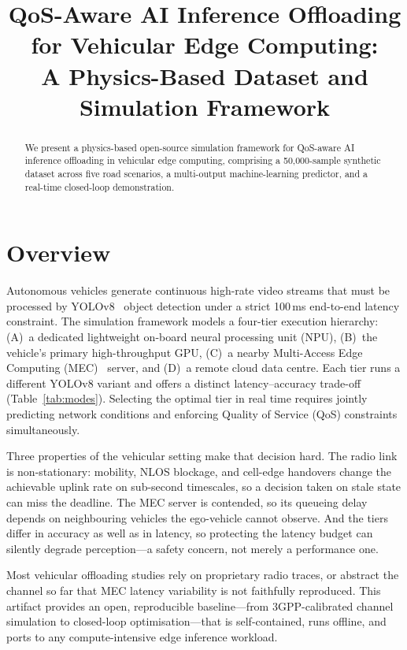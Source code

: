 \documentclass[10pt,conference]{IEEEtran}
\title{QoS-Aware AI Inference Offloading for Vehicular Edge Computing:\\
       A Physics-Based Dataset and Simulation Framework}
\author{%
  \IEEEauthorblockN{%
    Konstantinos Gyftodimos,\quad
    Eirini Liotou,\quad
    Kyriakos Chiotis,\quad
    George Dimitrakopoulos%
  }%
  \IEEEauthorblockA{%
    Dept.\ of Informatics and Telematics,
    Harokopio University of Athens (HUA), Athens, Greece\\
    \{kgyftodimos,\;eliotou,\;kchiotis,\;gdimitra\}@\textit{hua.gr}\quad
    \textit{Presenter: K.\,Gyftodimos\,---\,onsite}%
  }%
}
\begin{document}
\maketitle

\begin{abstract}
We present a physics-based open-source simulation framework for QoS-aware AI
inference offloading in vehicular edge computing, comprising a 50,000-sample
synthetic dataset across five road scenarios, a multi-output machine-learning
predictor, and a real-time closed-loop demonstration.
\end{abstract}

\section{Overview}

Autonomous vehicles generate continuous high-rate video streams that must be
processed by YOLOv8~\cite{yolov8} object detection under a strict 100\,ms
end-to-end latency constraint.  The simulation framework models a four-tier
execution hierarchy: (A)~a dedicated lightweight on-board neural processing
unit (NPU), (B)~the vehicle's primary high-throughput GPU, (C)~a nearby
Multi-Access Edge Computing (MEC)~\cite{etsi_mec} server, and (D)~a remote
cloud data centre.  Each tier runs a different YOLOv8 variant and offers a
distinct latency--accuracy trade-off (Table~\ref{tab:modes}).  Selecting the
optimal tier in real time requires jointly predicting network conditions and
enforcing Quality of Service (QoS) constraints simultaneously.

Three properties of the vehicular setting make that decision hard.  The radio
link is non-stationary: mobility, NLOS blockage, and cell-edge handovers
change the achievable uplink rate on sub-second timescales, so a decision
taken on stale state can miss the deadline.  The MEC server is contended, so
its queueing delay depends on neighbouring vehicles the ego-vehicle cannot
observe.  And the tiers differ in accuracy as well as in latency, so
protecting the latency budget can silently degrade perception---a safety
concern, not merely a performance one.

Most vehicular offloading studies rely on proprietary radio traces, or
abstract the channel so far that MEC latency variability is not faithfully
reproduced.  This artifact provides an open, reproducible baseline---from
3GPP-calibrated channel simulation to closed-loop optimisation---that is
self-contained, runs offline, and ports to any compute-intensive edge
inference workload.
\end{document}
